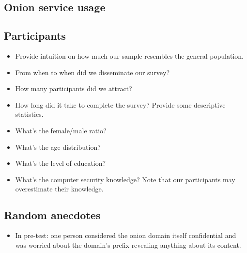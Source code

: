 \subsection{Onion service usage}

\subsection{Participants}
\begin{itemize}
    \item Provide intuition on how much our sample resembles the general
        population.
    \item From when to when did we disseminate our survey?
    \item How many participants did we attract?
    \item How long did it take to complete the survey?  Provide some descriptive statistics.
    \item What's the female/male ratio?
    \item What's the age distribution?
    \item What's the level of education?
    \item What's the computer security knowledge?  Note that our participants
        may overestimate their knowledge.
\end{itemize}

\subsection{Random anecdotes}
\begin{itemize}
    \item In pre-test: one person considered the onion domain itself
        confidential and was worried about the domain's prefix revealing
        anything about its content.
\end{itemize}
